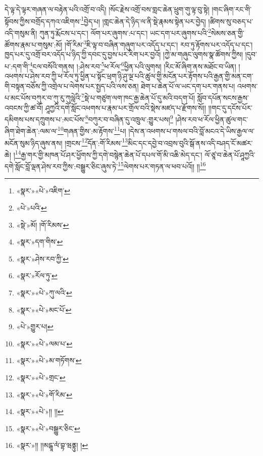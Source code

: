 དེ་ལྟ་དེ་ལྟར་གཞན་ལ་བརྟེན་པའི་འགྲོ་བ་འདི། །སོང་རྗེས་འགྲོ་བས་གླང་ཆེན་ཕྲུག་གུ་ལྟ་བུ་སྟེ། །གང་ཞིག་རང་གི་སྟོབས་ཀྱིས་བགྲོད་དཀའ་འཇིགས་\footnote{«སྣར་»«པེ་»འཇིག་}བྱེད་པ། །གླང་ཆེན་དེ་ཉིད་ལ་ནི་སྡེ་རྣམས་སྟེན་པར་བྱེད། །ཚིགས་སུ་བཅད་པ་འདི་གསུམ་ནི། ཀུན་ཏུ་རྨོངས་པ་དང་། ལོག་པར་ཞུགས་:པ་དང་། ཡང་དག་པར་ཞུགས་པའི་\footnote{«པེ་»པའི་}སེམས་ཅན་གྱི་ཚོགས་རྣམ་པ་གསུམ་:མོ། །གོ་རིམ་\footnote{«སྡེ་»མོ། །གོ་རིམས་}ཇི་ལྟ་བ་བཞིན་གཞུག་པར་འདོད་པ་དང་། རབ་ཏུ་རྟོགས་པར་འདོད་པ་དང་། ཁྱད་པར་དུ་འགྲོ་བར་འདོད་པ་ཉིད་ཀྱི་དབང་དུ་བྱས་པར་རིག་པར་བྱའོ། །ཀྱེ་མ་གཞུང་ལུགས་སྣ་ཚོགས་ཀྱིས། །དུབ་པ་:དག་གི་\footnote{«སྣར་»དག་གིས་}ངལ་བསོའི་གནས། །:ཤེས་རབ་\footnote{«སྣར་»ཤེས་རབ་ཀྱི་}ཕ་རོལ་\footnote{«སྣར་»རོལ་ཏུ་}ཕྱིན་པའི་ལུགས། །རིང་མོ་ཞིག་ནས་མཐོང་བ་ཡིན། །འཕགས་པ་ཤེས་རབ་ཀྱི་ཕ་རོལ་ཏུ་ཕྱིན་པ་སྟོང་ཕྲག་ཉི་ཤུ་ལྔ་པའི་ཚུལ་གྱི་མངོན་པར་རྟོགས་པའི་རྒྱན་གྱི་མན་ངག་གི་བསྟན་བཅོས་ཀྱི་འགྲེལ་པ་ལེགས་པར་སྤྱད་པའི་ལས་ཅན། ཐེག་པ་ཆེན་པོ་ལ་ཡང་དག་པར་གནས་པ། འཕགས་པ་མང་པོས་བཀུར་བ་ཀུ་རུ་ཀུལླེའི་\footnote{«སྣར་»«པེ་»ཀུ་ལའི་}སྡེ་པ་གཙུག་ལག་ཁང་རྒྱ་ཆེན་པོ་དུ་མའི་བདག་པོ། སློབ་དཔོན་སངས་རྒྱས་འབངས་ཀྱི་ཚ་བོ། ཤཱཀྱའི་དགེ་སློང་འཕགས་པ་རྣམ་པར་གྲོལ་བའི་སྡེས་མཛད་པ་རྫོགས་སོ།། །།གང་དུ་དངོས་པོར་དམིགས་པས་དཀྲུགས་པ་:མང་པོས་\footnote{«སྣར་»«པེ་»མང་པོ་}བཀུར་བ་བཞིན་དུ་འཁྲུལ་:གྱུར་པས།\footnote{«པེ་»གྱུར་པ།} །ཤེས་རབ་ཕ་རོལ་ཕྱིན་ཚུལ་གང་ཞིག་ཐེག་ཆེན་:ལམ་ལ་\footnote{«སྣར་»«པེ་»ལམ་པ་}གཞན་གྱིས་:མ་རྟོགས་\footnote{«སྣར་»«པེ་»མ་གཏོགས་}པ། །དེས་ན་འཕགས་པ་གསལ་བའི་བློ་མངའ་དེ་ཡིས་རྒྱལ་ལ་མངོན་སུམ་ཉིད་ཞུས་ནས། །གྲངས་\footnote{«སྣར་»«པེ་»གྲང་}དོན་:གོ་རིམས་\footnote{«སྣར་»«པེ་»གོ་རིམ་}མིང་དང་དབྱེ་བ་འབྲས་བུའི་སྒོ་ནས་འདི་བཤད་ངོ་མཚར་ཆེ། །\footnote{«སྣར་»«པེ་»།། །།}རྒྱ་གར་གྱི་མཁན་པོ་ཤར་ཕྱོགས་ཀྱི་དགེ་བསྙེན་ཆེན་པོ་དཔལ་གོ་མི་འཆི་མེད་དང་། ལོ་ཙཱ་བ་ཆེན་པོ་ཤཱཀྱའི་དགེ་སློང་བློ་ལྡན་ཤེས་རབ་ཀྱིས་:བསྒྱུར་ཅིང་ཞུས་ཏེ་\footnote{«སྣར་»«པེ་»བསྒྱུར་ཅིང་}ལེགས་པར་གཏན་ལ་ཕབ་པའོ།། །།\footnote{«སྣར་»།། །།མངྒཱ་ལཾ་བྷ་ཝནྟུ། །}
